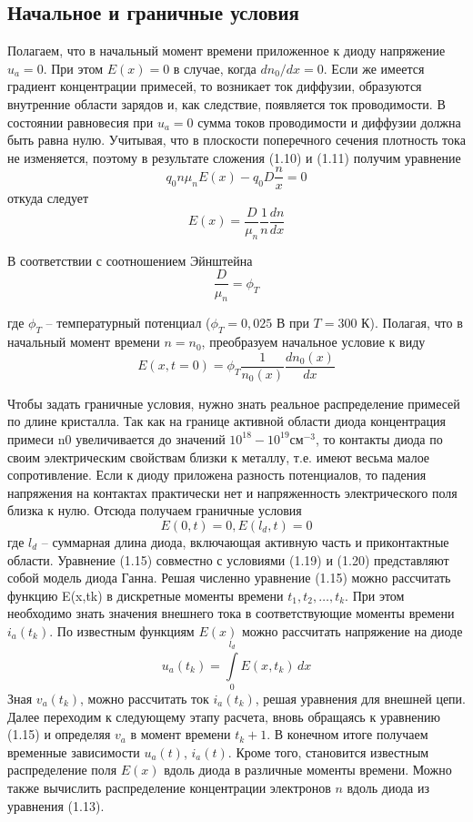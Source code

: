 \documentclass[a4paper, 12pt]{article}
\begin{document}
\subsection{Начальное и граничные условия}

Полагаем, что в начальный момент времени приложенное к диоду
напряжение $u_a = 0$. При этом $E(x) = 0$ в случае, когда $dn_0/dx=0$. Если же имеется
градиент концентрации примесей, то возникает ток диффузии, образуются
внутренние области зарядов и, как следствие, появляется ток проводимости.
В состоянии равновесия при $u_a = 0$ сумма токов проводимости и диффузии
должна быть равна нулю. Учитывая, что в плоскости поперечного сечения
плотность тока не изменяется, поэтому в результате сложения (1.10) и (1.11)
получим уравнение
\[q_0 n \mu_n E(x) - q_0 D \frac{n}{x} = 0\]
откуда следует
\[E(x) = \frac{D}{\mu_n}\frac{1}{n}\frac{dn}{dx}\]

В соответствии с соотношением Эйнштейна
\[\frac{D}{\mu_n} = \phi_T\]




где $\phi_T$ – температурный потенциал ($\phi_T =0,025$ В при $T=300$ К).
Полагая, что в начальный момент времени $n = n_0$, преобразуем начальное условие
к виду
\[E(x, t=0) = \phi_T \frac{1}{n_0(x)}\frac{dn_0(x)}{dx}\]

Чтобы задать граничные условия, нужно знать реальное распределение
примесей по длине кристалла. Так как на границе активной области диода
концентрация примеси n0 увеличивается до значений $10^{18}-10^{19}\text{см}^{-3}$, то контакты
диода по своим электрическим свойствам близки к металлу, т.е. имеют весьма
малое сопротивление. Если к диоду приложена разность потенциалов, то падения
напряжения на контактах практически нет и напряженность электрического поля
близка к нулю. Отсюда получаем граничные условия
\[E(0, t) = 0, E(l_d, t) = 0\]
где $l_d$ – суммарная длина диода, включающая активную часть и приконтактные
области.
Уравнение (1.15) совместно с условиями (1.19) и (1.20) представляют собой
модель диода Ганна. Решая численно уравнение (1.15) можно рассчитать
функцию E(x,tk) в дискретные моменты времени $t_1, t_2, \dots, t_k$. При этом необходимо
знать значения внешнего тока в соответствующие моменты времени $i_a(t_k)$. По
известным функциям $E(x)$ можно рассчитать напряжение на диоде
\[u_a(t_k) = \int\limits_{0}^{l_d}E(x, t_k)\,dx\]
Зная $v_a(t_k)$, можно рассчитать ток $i_a(t_k)$, решая уравнения для внешней цепи.
Далее переходим к следующему этапу расчета, вновь обращаясь к
уравнению (1.15) и определяя $v_a$ в момент времени $t_k+1$. В конечном итоге
получаем временные зависимости $u_a(t)$, $i_a(t)$. Кроме того, становится известным
распределение поля $E(x)$ вдоль диода в различные моменты времени. Можно
также вычислить распределение концентрации электронов $n$ вдоль диода из
уравнения (1.13).
\end{document}
